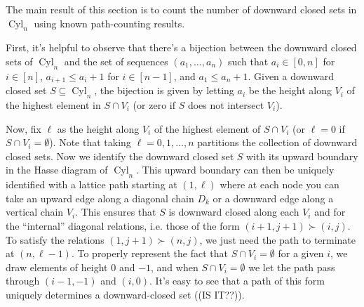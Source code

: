 \documentclass[12pt]{article}
\DeclareMathOperator{\Cyl}{Cyl}
\newcommand{\1}[1]{\mathds{1}[{#1}]}
\begin{document}

The main result of this section is to count the number of downward closed sets
in $\Cyl_n$ using known path-counting results.

First, it's helpful to observe that there's a bijection between the downward
closed sets of $\Cyl_n$ and the set of sequences $(a_1,\ldots,a_n)$ such that
$a_i \in [0,n]$ for $i\in[n]$, $a_{i+1}\le a_i + 1$ for $i\in[n-1]$, and
$a_1\le a_n+1$. Given a downward closed set $S\subseteq \Cyl_n$, 
the bijection is given by letting $a_i$ be the height along $V_i$ of the 
highest element in $S\cap V_i$ (or zero if $S$ does not intersect $V_i$).

Now, fix $\ell$ as the height along $V_i$ of the highest element of $S\cap V_i$
(or $\ell=0$ if $S\cap V_i=\emptyset$).
Note that taking $\ell=0,1,\ldots,n$ partitions the collection of downward
closed sets. Now we identify the downward closed set $S$ with its upward
boundary in the Hasse diagram of $\Cyl_n$.
This upward boundary can then be uniquely identified with a lattice path
starting at $(1,\ell)$ where
at each node you can take an upward edge along a diagonal chain $D_k$ or a
downward edge along a vertical chain $V_i$.
This ensures that $S$ is downward closed along each $V_i$ and for the
``internal'' diagonal relations, i.e. those of the form $(i+1,j+1)\succ (i,j)$.
To satisfy the relations $(1,j+1)\succ (n,j)$, we just need the path to
terminate at $(n,\ell-1)$. To properly represent the fact that 
$S\cap V_i = \emptyset$ for a given $i$, we draw elements of height $0$ and
$-1$, and when $S\cap V_i = \emptyset$ we let the path pass through $(i-1, -1)$
and $(i,0)$. It's easy to see that a path of this form uniquely determines a
downward-closed set ((IS IT??)).
\end{document}
